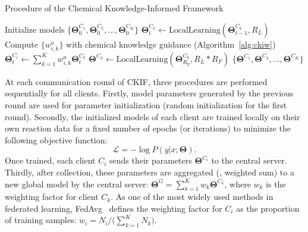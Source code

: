 \begin{algorithm}[b]
    \caption{Procedure of the Chemical Knowledge-Informed Framework}
    \label{alg:overview}
    \begin{algorithmic}[1]
    \State Initialize models $\{\bm{\Theta}^{C_1}_0, \bm{\Theta}^{C_2}_0, ..., \bm{\Theta}^{C_K}_0\}$
            \State $\bm{\Theta}^{C_k}_t \leftarrow \text{LocalLearning}(\bm{\Theta}^{C_k}_{t-1}, R_L)$
        \EndFor
        \State Compute $\{w_{i,k}^a\}$ with chemical knowledge guidance (Algorithm~\ref{alg:ckiw})
            \State $\bm{\Theta}^{C_i}_t \leftarrow \sum\nolimits_{k=1}^{K} w_{i,k}^a \bm{\Theta}^{C_k}_t$
        \EndFor
    \EndFor
        \State $\bm{\Theta}^{C_k} \leftarrow \text{LocalLearning}(\bm{\Theta}^{C_k}_{R_T}, R_L*R_F)$
    \EndFor
    \State \Return $\{\bm{\Theta}^{C_1}, \bm{\Theta}^{C_2}, ..., \bm{\Theta}^{C_K}\}$
    
    \end{algorithmic}
\end{algorithm}



At each communication round of CKIF, three procedures are performed sequentially for all clients. Firstly, model parameters generated by the previous round are used for parameter initialization (random initialization for the first round). Secondly, the initialized models of each client are trained locally on their own reaction data for a fixed number of epochs (or iterations) to minimize the following objective function:
\begin{equation}
    \mathcal{L} = -\log P(y \vert x;\bm{\Theta}).
\end{equation}
Once trained, each client $C_i$ sends their parameters $\bm{\Theta}^{C_i}$ to the central server. Thirdly, after collection, these parameters are aggregated (\ie, weighted sum) to a new global model by the central server: $\bm{\Theta}^{G} = \sum_{k=1}^{K} w_k \bm{\Theta}^{C_k}$, where $w_k$ is the weighting factor for client $C_k$. As one of the most widely used methods in federated learning, FedAvg~\citep{mcmahan2017communication} defines the weighting factor for $C_i$ as the proportion of training samples: $w_i = N_i / \big(\sum_{k=1}^{K}N_k\big)$.


